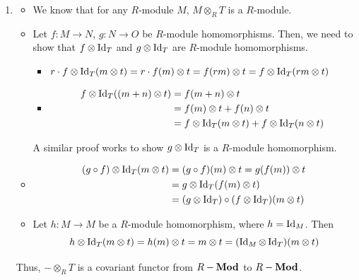 \documentclass[Notebook.tex]{subfiles}
\begin{document}
\begin{solution}
\begin{enumerate}
        \item \begin{itemize}
            \item We know that for any $R$-module $M$, $M\otimes_RT$ is a $R$-module. 
            \item Let $f: M \to N$, $g: N \to O$ be $R$-module homomorphisms. Then, we need to show that $f \otimes \operatorname{Id}_T$ and $g \otimes \operatorname{Id}_T$ are $R$-module homomorphisms. 
            \begin{itemize}
                \item $r \cdot f \otimes \operatorname{Id}_T( m \otimes t) = r \cdot f(m) \otimes t = f(rm) \otimes t = f \otimes \operatorname{Id}_T( rm \otimes t)$
                \item \begin{align*}
                     f \otimes \operatorname{Id}_T((m+n) \otimes t) &= f(m+n) \otimes t \\
                     &= f(m) \otimes t + f(n) \otimes t \\
                     &=  f \otimes \operatorname{Id}_T( m \otimes t) + f \otimes \operatorname{Id}_T(n \otimes t) 
                \end{align*}
            \end{itemize}
            A similar proof works to show $g \otimes \operatorname{Id}_T$ is a $R$-module homomorphism. 
            \item \begin{align*}
                (g \circ f) \otimes \operatorname{Id}_T (m \otimes t) &= (g \circ f)(m) \otimes t 
                = g(f(m)) \otimes t  \\ 
                &= g \otimes \operatorname{Id}_T (f(m) \otimes t)  \\
                &=( g \otimes \operatorname{Id}_T) \circ (f \otimes \operatorname{Id}_T) (m \otimes t) 
            \end{align*}
            \item Let $h: M \to M$ be a $R$-module homomorphism, where $h = \operatorname{Id}_M$. Then 
            \[h \otimes \operatorname{Id}_T  (m \otimes t)= h(m) \otimes t = m \otimes t = (\operatorname{Id}_M \otimes \operatorname{Id}_T) (m \otimes t)\]
        \end{itemize}
        Thus, $- \otimes_R T$ is a covariant functor from $R-\operatorname{\textbf{Mod}}$ to $R-\operatorname{\textbf{Mod}}$. 


\end{enumerate}
\end{solution}
\end{document}
